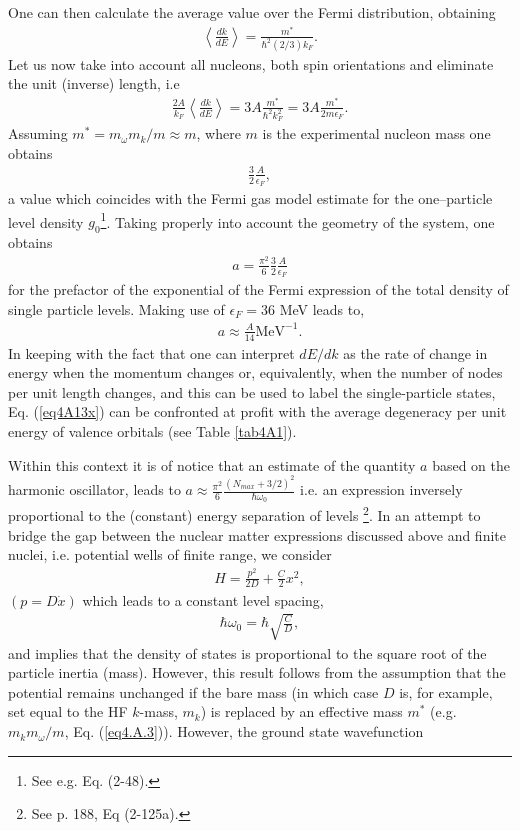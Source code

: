 One can then calculate the average value over the Fermi distribution, obtaining
\begin{align}
\left\langle\frac{dk}{dE}\right\rangle=\frac{m^*}{\hbar^2(2/3)k_F}.
\end{align}
 Let us now take into account all nucleons, both spin orientations and eliminate the unit (inverse) length, i.e
\begin{align}
\frac{2A}{k_F}\left\langle\frac{dk}{dE}\right\rangle=3A\frac{m^*}{\hbar^2k_F^2}=3A\frac{m^*}{2m\epsilon_F}.
\end{align}
Assuming $m^*=m_\omega m_k/m\approx m$, where $m$ is the experimental nucleon mass one obtains
\begin{align}
\frac{3}{2}\frac{A}{\epsilon_F},
\end{align}
a value which coincides with the Fermi gas model estimate for the one--particle level density $g_0$\footnote{See e.g. \cite{Bohr:69} Eq. (2-48).}. Taking properly into account the geometry of the system, one obtains
\begin{align}\label{eq4A13}
a=\frac{\pi^2}{6}\frac{3}{2}\frac{A}{\epsilon_F}
\end{align}
for the prefactor of the exponential of the Fermi expression of the total density of single particle levels. Making use of $\epsilon_F=36$ MeV leads to,
\begin{align}\label{eq4A13x}
a\approx\frac{A}{14}\text{MeV}^{-1}.
\end{align}
In keeping with the fact that one can interpret $dE/dk$ as the rate of change in energy when the momentum changes or, equivalently, when the number of nodes per unit length changes, and this can be used to label the single-particle states, Eq. (\ref{eq4A13x}) can be confronted at profit with the average degeneracy per unit energy of valence orbitals (see Table \ref{tab4A1}). 



Within this context it is of notice that an estimate of the quantity $a$ based on the harmonic oscillator, leads to $a\approx\frac{\pi^2}{6}\frac{(N_{max}+3/2)^2}{\hbar\omega_0}$ i.e. an expression inversely proportional to the (constant) energy separation of levels \footnote{See \cite{Bohr:69} p. 188, Eq (2-125a).}. In an attempt to bridge the gap between the nuclear matter expressions discussed above and finite nuclei, i.e. potential wells of finite range, we consider
\begin{align}\label{eq4A14}
H=\frac{p^2}{2D}+\frac{C}{2}x^2,
\end{align}
$(p=D\dot x)$ which leads to a constant level spacing,
\begin{align}
\hbar\omega_0=\hbar\sqrt{\frac{C}{D}},
\end{align}
 and implies that the density of states is proportional to the square root of the particle inertia (mass). However, this result follows from the assumption that the potential remains unchanged if the bare mass (in which case $D$ is, for example, set equal to the HF $k$-mass, $m_k$) is replaced by an effective mass $m^*$ (e.g. $m_km_\omega/m$, Eq. (\ref{eq4.A.3})). However, the ground state wavefunction
 
